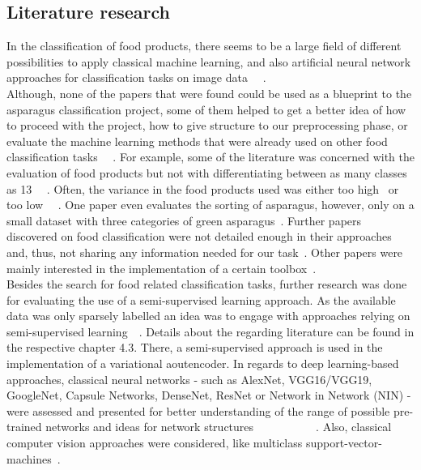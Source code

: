 \subsection{Literature research}

In the classification of food products, there seems to be a large field of different possibilities to apply classical machine learning, and also artificial neural network approaches for classification tasks on image data~\citep{bhargava2018fruits} ~\citep{brosnan2002inspection}. \\
Although, none of the papers that were found could be used as a blueprint to the asparagus classification project, some of them helped to get a better idea of how to proceed with the project, how to give structure to our preprocessing phase, or evaluate the machine learning methods that were already used on other food classification tasks~\citep{mery2013automated} ~\citep{bhargava2018fruits}. For example, some of the literature was concerned with the evaluation of food products but not with differentiating between as many classes as 13~\citep{diaz2004comparison} ~\citep{kilicc2007classification}. Often, the variance in the food products used was either too high~\citep{zhang2012classification} or too low~\citep{kilicc2007classification} ~\citep{al2011dates}.  One paper even evaluates the sorting of asparagus, however, only on a small dataset with three categories of green asparagus~\citep{donis2016classification}. Further papers discovered on food classification were not detailed enough in their approaches and, thus, not sharing any information needed for our task~\citep{pedreschi2016grading}. Other papers were mainly interested in the implementation of a certain toolbox~\citep{mery2013automated}. \\
Besides the search for food related classification tasks, further research was done for evaluating the use of a semi-supervised learning approach. As the available data was only sparsely labelled an idea was to engage with approaches relying on semi-supervised learning~\citep{olivier2006semi}~\citep{zhu05survey}. Details about the regarding literature can be found in the respective chapter 4.3. There, a semi-supervised approach is used in the implementation of a variational aoutencoder. In regards to deep learning-based approaches, classical neural networks - such as AlexNet, VGG16/VGG19, GoogleNet, Capsule Networks,  DenseNet, ResNet or Network in Network (NIN) - were assessed and presented for better understanding of the range of possible pre-trained networks and ideas for network structures~\citep{alexnet2012original} ~\citep{vgg2014original} ~\citep{googlenet2015original} ~\citep{capsulenet2017original} ~\citep{densenet2017original} ~\citep{resnet2016original} ~\citep{lin2013network}. Also, classical computer vision approaches were considered, like multiclass support-vector-machines~\citep{prakash2012multi}. \\
